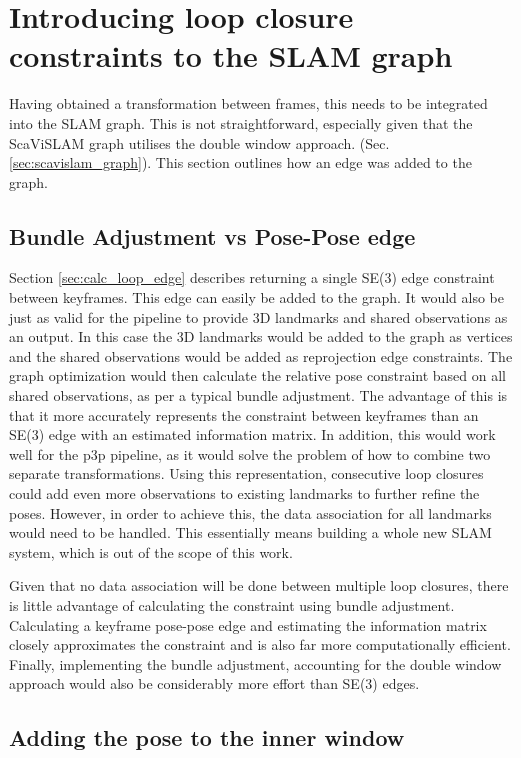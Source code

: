 \section{Introducing loop closure constraints to the SLAM graph}

Having obtained a transformation between frames, this needs to be integrated into the SLAM graph.  This is not straightforward, especially given that the ScaViSLAM graph utilises the double window approach.  (Sec. \ref{sec:scavislam_graph}).  This section outlines how an edge was added to the graph.

\subsection{Bundle Adjustment vs Pose-Pose edge}

Section \ref{sec:calc_loop_edge} describes returning a single SE(3) edge constraint between keyframes.  This edge can easily be added to the graph.  It would also be just as valid for the pipeline to provide 3D landmarks and shared observations as an output.  In this case the 3D landmarks would be added to the graph as vertices and the shared observations would be added as reprojection edge constraints.  The graph optimization would then calculate the relative pose constraint based on all shared observations, as per a typical bundle adjustment.  The advantage of this is that it more accurately represents the constraint between keyframes than an SE(3) edge  with an estimated information matrix.  In addition, this would work well for the p3p pipeline, as it would solve the problem of how to combine two separate transformations.  Using this representation, consecutive loop closures could add even more observations to existing landmarks to further refine the poses.  However, in order to achieve this, the data association for all landmarks would need to be handled.  This essentially means building a whole new SLAM system, which is out of the scope of this work.

Given that no data association will be done between multiple loop closures, there is little advantage of calculating the constraint using bundle adjustment.  Calculating a keyframe pose-pose edge and estimating the information matrix closely approximates the constraint and is also far more computationally efficient.  Finally, implementing the bundle adjustment, accounting for the double window approach would also be considerably more effort than SE(3) edges.

\subsection{Adding the pose to the inner window}

